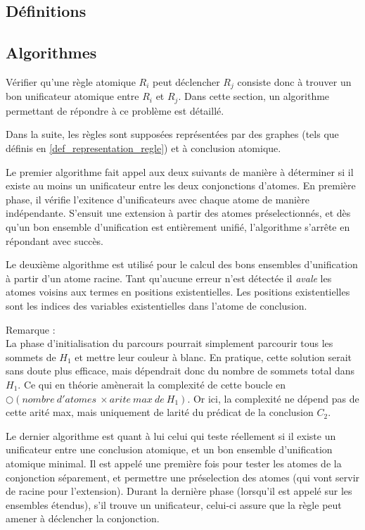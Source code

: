 \subsection{Définitions}\label{grd_unif_def}


\subsection{Algorithmes}\label{grd_algo}
	Vérifier qu'une règle atomique $R_i$ peut déclencher $R_j$ consiste donc à trouver un bon
	unificateur atomique entre $R_i$ et $R_j$. Dans cette section, un algorithme
	permettant de répondre à ce problème est détaillé.

	Dans la suite, les règles sont supposées représentées par des graphes (tels que
	définis en \ref{def_representation_regle}) et à conclusion atomique.

	Le premier algorithme fait appel aux deux suivants de manière à déterminer si il
	existe au moins un unificateur entre les deux conjonctions d'atomes.
	En première phase, il vérifie l'exitence d'unificateurs avec chaque atome de manière
	indépendante. S'ensuit une extension à partir des atomes préselectionnés, et dès
	qu'un bon ensemble d'unification est entièrement unifié, l'algorithme s'arrête en
	répondant avec succès.
	

	Le deuxième algorithme est utilisé pour le calcul des bons ensembles d'unification à
	partir d'un atome racine. Tant qu'aucune erreur n'est détectée il {\em avale} les atomes
	voisins aux termes en positions existentielles.
	Les positions existentielles sont les indices des variables existentielles dans
	l'atome de conclusion.
	

	Remarque : \\
	La phase d'initialisation du parcours pourrait simplement parcourir tous les sommets
	de $H_{1}$ et mettre leur couleur \`a blanc.
	En pratique, cette solution serait sans doute plus efficace, mais d\'ependrait donc
	du nombre de sommets total dans $H_{1}$.
	Ce qui en th\'eorie am\`enerait la complexit\'e de cette boucle en 
	$\bigcirc(nombre\ d'atomes\ \times arite\ max\ de\ H_{1})$.
	Or ici, la complexit\'e ne d\'epend pas de cette arit\'e max, mais uniquement de
	larit\'e du pr\'edicat de la conclusion $C_{2}$.

	Le dernier algorithme est quant à lui celui qui teste réellement si il existe un unificateur
	entre une conclusion atomique, et un bon ensemble d'unification atomique minimal.
	Il est appelé une première fois pour tester les atomes de la conjonction séparement,
	et permettre une préselection des atomes (qui vont servir de racine pour l'extension).
	Durant la dernière phase (lorsqu'il est appelé sur les ensembles étendus), s'il trouve
	un unificateur, celui-ci assure que la règle peut amener à déclencher la conjonction.
	



